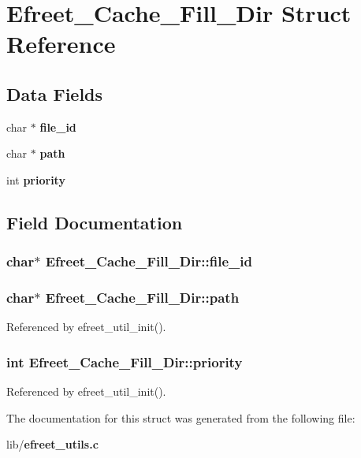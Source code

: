 \section{Efreet\_\-Cache\_\-Fill\_\-Dir Struct Reference}
\label{structEfreet__Cache__Fill__Dir}
\subsection*{Data Fields}
\begin{CompactItemize}
\item 
char $\ast$ {\bf file\_\-id}
\item 
char $\ast$ {\bf path}
\item 
int {\bf priority}
\end{CompactItemize}


\subsection{Field Documentation}
\subsubsection[file\_\-id]{\setlength{\rightskip}{0pt plus 5cm}char$\ast$ {\bf Efreet\_\-Cache\_\-Fill\_\-Dir::file\_\-id}}\label{structEfreet__Cache__Fill__Dir_04bd334e812e54233e93f4da517b4795}


\subsubsection[path]{\setlength{\rightskip}{0pt plus 5cm}char$\ast$ {\bf Efreet\_\-Cache\_\-Fill\_\-Dir::path}}\label{structEfreet__Cache__Fill__Dir_922aae798beba37998ba965356d67cc4}




Referenced by efreet\_\-util\_\-init().
\subsubsection[priority]{\setlength{\rightskip}{0pt plus 5cm}int {\bf Efreet\_\-Cache\_\-Fill\_\-Dir::priority}}\label{structEfreet__Cache__Fill__Dir_48d19b19a1a992c1baa56dc222216c66}




Referenced by efreet\_\-util\_\-init().

The documentation for this struct was generated from the following file:\begin{CompactItemize}
\item 
lib/{\bf efreet\_\-utils.c}\end{CompactItemize}
